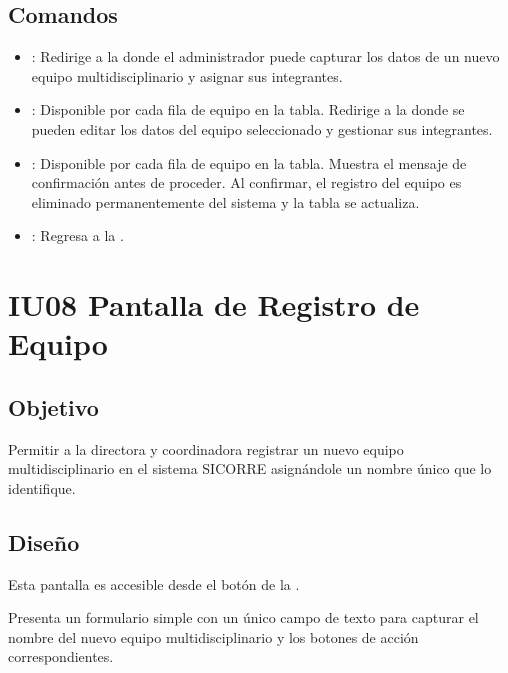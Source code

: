 \subsection{Comandos}
\begin{itemize}
	\item {}: Redirige a la 
	 donde el 
	administrador puede capturar los datos de un nuevo equipo 
	multidisciplinario y asignar sus integrantes.
	
	\item {}: Disponible por cada fila de equipo 
	en la tabla. Redirige a la 
	 donde se 
	pueden editar los datos del equipo seleccionado y gestionar 
	sus integrantes.
	
	\item {}: Disponible por cada fila de equipo 
	en la tabla. Muestra el mensaje de confirmación 
	 antes de 
	proceder. Al confirmar, el registro del equipo es eliminado 
	permanentemente del sistema y la tabla se actualiza.
	
	\item {}: Regresa a la 
	.
\end{itemize}



\section{IU08 Pantalla de Registro de Equipo}

\subsection{Objetivo}
Permitir a la directora y coordinadora registrar un nuevo equipo 
multidisciplinario en el sistema SICORRE asignándole un nombre 
único que lo identifique.

\subsection{Diseño}
Esta pantalla  es 
accesible desde el botón  de la 
.

Presenta un formulario simple con un único campo de texto para 
capturar el nombre del nuevo equipo multidisciplinario y los 
botones de acción correspondientes.

